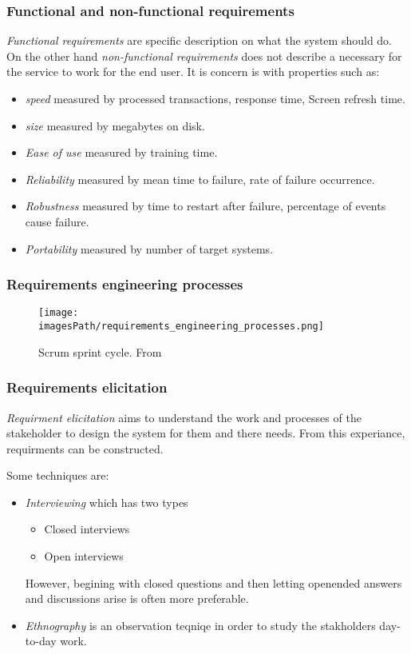 \subsubsection{Functional and non-functional requirements}
\textit{Functional requirements} are specific description on what the system should do.
On the other hand \textit{non-functional requirements} does not describe a necessary
for the service to work for the end user. It is concern is with properties such as:
\begin{itemize}
\item \textit{speed} measured by processed transactions, response time, Screen refresh time.
\item \textit{size} measured by megabytes on disk.
\item \textit{Ease of use} measured by training time.
\item \textit{Reliability} measured by mean time to failure, rate of failure occurrence.
\item \textit{Robustness} measured by time to restart after failure, percentage of events cause failure.
\item \textit{Portability} measured by number of target systems.
\end{itemize}

\subsubsection{Requirements engineering processes}
\begin{figure}[!ht]
    \centering
    \texttt{[image: \\imagesPath/requirements\_engineering\_processes.png]}
    \caption{Scrum sprint cycle. From \cite{}}
\end{figure}


\subsubsection{Requirements elicitation}
\textit{Requirment elicitation} aims to understand the work and processes of the stakeholder
to design the system for them and there needs. From this experiance, requirments can be constructed.

Some techniques are:
\begin{itemize}
\item \textit{Interviewing} which has two types
  \begin{itemize}
    \item Closed interviews
    \item Open interviews
  \end{itemize}
  However, begining with closed questions and then letting openended answers and discussions arise is often more preferable.
\item \textit{Ethnography} is an observation teqniqe in order to study the stakholders day-to-day work. 
\end{itemize}

